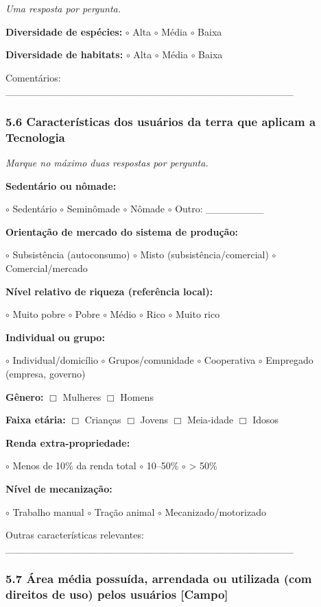 \emph{Uma resposta por pergunta.}

\textbf{Diversidade de espécies:} $\circ$ Alta $\circ$ Média $\circ$ Baixa

\textbf{Diversidade de habitats:} $\circ$ Alta $\circ$ Média $\circ$ Baixa

Comentários: \_\_\_\_\_\_\_\_\_\_\_\_\_\_\_\_\_\_\_\_\_\_\_\_\_\_\_\_\_\_\_\_\_\_\_\_\_\_\_\_

\subsubsection{5.6 Características dos usuários da terra que aplicam a Tecnologia}\label{caracteruxedsticas-dos-usuuxe1rios-da-terra-que-aplicam-a-tecnologia}

\emph{Marque no máximo duas respostas por pergunta.}

\textbf{Sedentário ou nômade:}

$\circ$ Sedentário $\circ$ Seminômade $\circ$ Nômade $\circ$ Outro: \_\_\_\_\_\_\_\_

\textbf{Orientação de mercado do sistema de produção:}

$\circ$ Subsistência (autoconsumo) $\circ$ Misto (subsistência/comercial) $\circ$ Comercial/mercado

\textbf{Nível relativo de riqueza (referência local):}

$\circ$ Muito pobre $\circ$ Pobre $\circ$ Médio $\circ$ Rico $\circ$ Muito rico

\textbf{Individual ou grupo:}

$\circ$ Individual/domicílio $\circ$ Grupos/comunidade $\circ$ Cooperativa $\circ$ Empregado (empresa, governo)

\textbf{Gênero:} $\Box$ Mulheres $\Box$ Homens

\textbf{Faixa etária:} $\Box$ Crianças $\Box$ Jovens $\Box$ Meia-idade $\Box$ Idosos

\textbf{Renda extra-propriedade:}

$\circ$ Menos de 10\% da renda total $\circ$ 10--50\% $\circ$ \textgreater{} 50\%

\textbf{Nível de mecanização:}

$\circ$ Trabalho manual $\circ$ Tração animal $\circ$ Mecanizado/motorizado

Outras características relevantes: \_\_\_\_\_\_\_\_\_\_\_\_\_\_\_\_\_\_\_\_\_\_\_\_\_\_\_\_\_\_\_\_\_\_\_\_\_\_\_\_

\subsubsection{5.7 Área média possuída, arrendada ou utilizada (com direitos de uso) pelos usuários {[Campo]}}\label{uxe1rea-muxe9dia-possuuxedda-arrendada-ou-utilizada-com-direitos-de-uso-pelos-usuuxe1rios}

